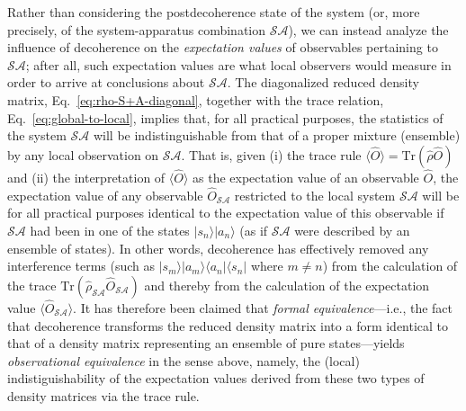 \documentclass[rmp,aps,amsmath,amsfonts,noshowkeys,noshowpacs,12pt]{revtex4}
\newcommand{\ket}[1]{\ensuremath{|{#1\rangle}}}
\newcommand{\bra}[1]{\ensuremath{{\langle #1}|}}
\begin{document}
Rather than considering the postdecoherence state of the system (or,
more precisely, of the system-apparatus combination $\mathcal{SA}$),
we can instead analyze the influence of decoherence on the
\emph{expectation values} of observables pertaining to $\mathcal{SA}$;
after all, such expectation values are what local observers would
measure in order to arrive at conclusions about $\mathcal{SA}$.  The
diagonalized reduced density matrix, Eq.~\eqref{eq:rho-S+A-diagonal},
together with the trace relation, Eq.~\eqref{eq:global-to-local},
implies that, for all practical purposes, the statistics of the system
$\mathcal{SA}$ will be indistinguishable from that of a proper mixture
(ensemble) by any local observation on $\mathcal{SA}$. That is, given
(i) the trace rule $\langle \widehat{O} \rangle =
\text{Tr}(\widehat{\rho}\widehat{O})$ and (ii) the interpretation of
$\langle \widehat{O} \rangle$ as the expectation value of an
observable $\widehat{O}$, the expectation value of any observable
$\widehat{O}_\mathcal{SA}$ restricted to the local system
$\mathcal{SA}$ will be for all practical purposes identical to the
expectation value of this observable if $\mathcal{SA}$ had been in one
of the states $\ket{s_n} \ket{a_n}$ (as if $\mathcal{SA}$ were
described by an ensemble of states).  In other words, decoherence has
effectively removed any interference terms (such as $\ket{s_m}
\ket{a_m} \bra{a_n} \bra{s_n}$ where $m \not= n$) from the calculation
of the trace
$\text{Tr}(\widehat{\rho}_\mathcal{SA}\widehat{O}_\mathcal{SA})$ and
thereby from the calculation of the expectation value $\langle
\widehat{O}_\mathcal{SA} \rangle$.  It has therefore been claimed that
\emph{formal equivalence}---i.e., the fact that decoherence transforms
the reduced density matrix into a form identical to that of a density
matrix representing an ensemble of pure states---yields
\emph{observational equivalence} in the sense above, namely, the
(local) indistiguishability of the expectation values derived from
these two types of density matrices via the trace rule.
\end{document}
